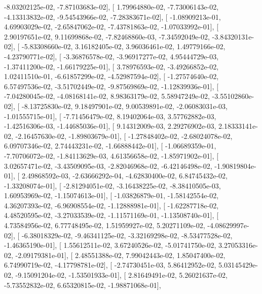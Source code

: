 \documentclass{article}
\begin{document}
         -8.03202125e-02,  -7.87103683e-02],
       [  1.79964880e-02,  -7.73006143e-02,  -4.13313832e-02,
         -9.54543966e-02,  -7.28383671e-02],
       [ -1.08909213e-01,   4.69903029e-02,  -2.65847062e-02,
         -7.43781863e-02,  -1.07033992e-01],
       [  2.90197651e-02,   9.11699868e-02,  -7.82468860e-03,
         -7.34592049e-02,  -3.84320131e-02],
       [ -5.83308660e-02,   3.16182405e-02,   3.96036461e-02,
          1.49779166e-02,  -4.23790771e-02],
       [ -3.36876578e-02,  -3.96917277e-02,   4.95444729e-03,
         -1.37411200e-02,  -1.66179225e-01],
       [  3.78976593e-02,  -3.49266852e-02,   1.02411510e-01,
         -6.61857299e-02,  -4.52987594e-02],
       [ -1.27574640e-02,   6.57497536e-02,  -3.51702449e-02,
         -9.87569869e-02,  -1.12839936e-01],
       [ -7.04280045e-02,  -4.08168141e-02,   8.98363179e-02,
          5.58947249e-02,  -3.55102860e-02],
       [ -8.13725830e-02,   9.18497901e-02,   9.00539891e-02,
         -2.06083031e-03,  -1.01555715e-01],
       [ -7.71456479e-02,   8.19402064e-03,   3.57762882e-03,
         -1.42516306e-03,  -1.44685036e-01],
       [  9.14312009e-03,   2.29276902e-03,   2.18333141e-02,
         -2.16457630e-02,  -1.89803679e-01],
       [ -1.27848402e-02,  -2.68024078e-02,   6.09707346e-02,
          2.74443231e-02,  -1.66888442e-01],
       [ -1.06689359e-01,  -7.70706072e-02,  -1.84113629e-03,
          4.61356658e-02,  -1.85971902e-01],
       [  3.02657471e-02,  -3.43509095e-03,  -2.82046968e-02,
         -6.42146498e-02,  -1.90819804e-01],
       [  2.49868592e-03,  -2.63666292e-04,  -4.62830400e-02,
          6.84745432e-02,  -1.33208074e-01],
       [ -2.81294051e-02,  -3.16438225e-02,  -8.38410505e-03,
          1.60953969e-02,  -1.15074613e-01],
       [ -1.03826879e-01,  -1.58142554e-02,   4.36207393e-02,
         -6.96908554e-02,  -1.12888981e-01],
       [ -1.62287718e-02,   4.48520595e-02,  -3.27033539e-02,
         -1.11571169e-01,  -1.13508740e-01],
       [  4.73584956e-02,   6.77748495e-02,   1.51959927e-02,
          5.20271109e-02,  -4.08629997e-02],
       [ -6.38018329e-02,  -9.46341125e-02,  -3.32169298e-02,
         -8.53477528e-02,  -1.46365190e-01],
       [  1.55612511e-02,   3.67240526e-02,  -5.01741750e-02,
          3.27053316e-02,  -2.09179381e-01],
       [  2.48551388e-02,   7.99042443e-02,   1.85047400e-02,
          6.74990719e-02,  -4.17798781e-02],
       [ -2.74730451e-03,   5.86412952e-02,   5.03145429e-02,
         -9.15091204e-02,  -1.53501933e-01],
       [  2.81649491e-02,   5.26021637e-02,  -5.73552832e-02,
          6.65320815e-02,  -1.98871068e-01],
\end{document}
